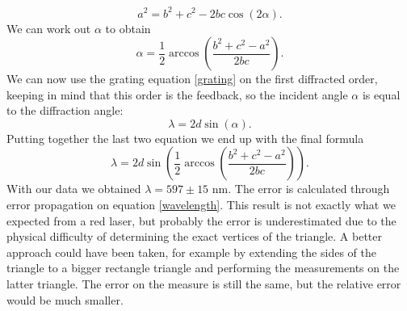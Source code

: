 \documentclass[a4paper,10pt]{article}
\begin{document}
\[a^2 = b^2 + c^2 -2bc\cos(2\alpha).\]
We can work out $\alpha$ to obtain
\[\alpha = \frac{1}{2}\arccos\left(\frac{b^2 + c^2 - a^2}{2bc}\right).\]
We can now use the grating equation \eqref{grating} on the first diffracted order, keeping in mind that this order is the feedback, so the incident angle $\alpha$ is equal to the diffraction angle:
\[\lambda = 2d\sin(\alpha).\]
Putting together the last two equation we end up with the final formula
\begin{equation}\label{wavelength}\lambda = 2d\sin\left(\frac{1}{2}\arccos\left(\frac{b^2 + c^2 - a^2}{2bc}\right)\right).\end{equation}
With our data we obtained $\lambda = 597\pm15$ nm. The error is calculated through error propagation on equation \eqref{wavelength}. This result is not exactly what we expected from a red laser, but probably the error is underestimated due to the physical difficulty of determining the exact vertices of the triangle. A better approach could have been taken, for example by extending the sides of the triangle to a bigger rectangle triangle and performing the measurements on the latter triangle. The error on the measure is still the same, but the relative error would be much smaller.
\end{document}
